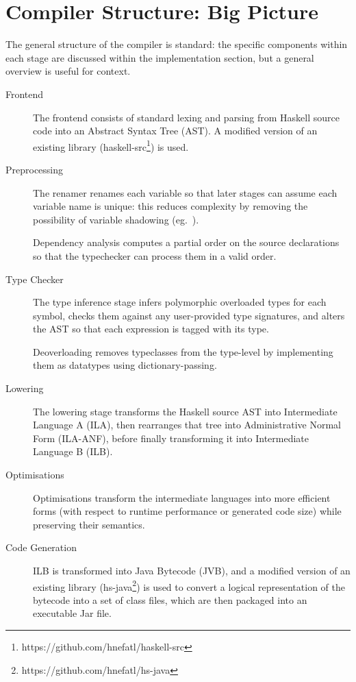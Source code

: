 \documentclass[dissertation.tex]{subfiles}
\begin{document}
\section{Compiler Structure: Big Picture}\label{sec:compiler-structure}
{
    The general structure of the compiler is standard: the specific components within each stage are discussed within the implementation section, but a general overview is useful for context.

    \begin{description}
    \item[Frontend]
    {
        \hfill

        The frontend consists of standard lexing and parsing from Haskell source code into an Abstract Syntax Tree (AST). A modified version of an existing library (haskell-src\footnote{https://github.com/hnefatl/haskell-src}) is used.

    }
    \item[Preprocessing]
    {
        \hfill

        The renamer renames each variable so that later stages can assume each variable name is unique: this reduces complexity by removing the possibility of variable shadowing (eg.\ ). 

        Dependency analysis computes a partial order on the source declarations so that the typechecker can process them in a valid order.
    }
    \item[Type Checker]
    {
        \hfill

        The type inference stage infers polymorphic overloaded types for each symbol, checks them against any user-provided type signatures, and alters the AST so that each expression is tagged with its type.

        Deoverloading removes typeclasses from the type-level by implementing them as datatypes using dictionary-passing.
    }
    \item[Lowering]
    {
        \hfill

        The lowering stage transforms the Haskell source AST into Intermediate Language A (ILA), then rearranges that tree into Administrative Normal Form (ILA-ANF), before finally transforming it into Intermediate Language B (ILB).
    }
    \item[Optimisations]
    {
        \hfill

        Optimisations transform the intermediate languages into more efficient forms (with respect to runtime performance or generated code size) while preserving their semantics.
    }
    \item[Code Generation]
    {
        \hfill

        ILB is transformed into Java Bytecode (JVB), and a modified version of an existing library (hs-java\footnote{https://github.com/hnefatl/hs-java}) is used to convert a logical representation of the bytecode into a set of class files, which are then packaged into an executable Jar file.
    }
    \end{description}
}
\end{document}

